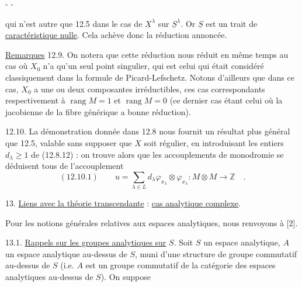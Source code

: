 \begin{center}-  -\end{center}
qui n'est autre que 12.5 dans le cas de $\underline X^\lambda$ sur $\underline S^\lambda$. Or $\underline S$ est un trait de \uline{caractéristique nulle}. Cela achève donc la réduction annoncée.

\uline{Remarques} 12.9. On notera que cette réduction nous réduit en même temps au cas où $X_0$ n'a qu'un seul point singulier, qui est celui qui était considéré classiquement dans la formule de Picard-Lefschetz. Notons d'ailleurs que dans ce cas, $X_0$ a une ou deux composantes irréductibles, ces cas correspondants respectivement à $\operatorname{rang}M=1$ et $\operatorname{rang}M=0$ (ce dernier cas étant celui où la jacobienne de la fibre générique a bonne réduction).

12.10. La démonstration donnée dans 12.8 nous fournit un résultat plus général que 12.5, valable sans supposer que $X$ soit régulier, en introduisant les entiers $d_\lambda\geq1$ de (12.8.12) : on trouve alors que les accouplements de monodromie se déduisent tous de l'accouplement
\[
(12.10.1)\qquad u=\sum_{\lambda\in L}d_\lambda\varphi_{x_\lambda}\otimes\varphi_{x_\lambda}:M\otimes M\longrightarrow\mathbb Z\quad.
\]

13. \uline{Liens avec la théorie transcendante} : \uline{cas analytique complexe}.

Pour les notions générales relatives aux espaces analytiques, nous renvoyons à [2].

13.1. \uline{Rappels sur les groupes analytiques sur} $S$. Soit $S$ un espace analytique, $A$ un espace analytique au-dessus de $S$, muni d'une structure de groupe commutatif au-dessus de $S$ (i.e. $A$ est un groupe commutatif de la catégorie des espaces analytiques au-dessus de $S$). On suppose

